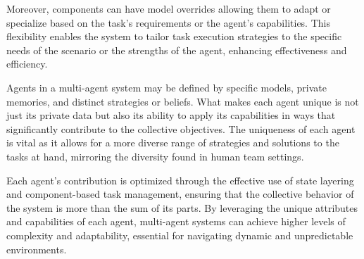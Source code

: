 Moreover, components can have model overrides allowing them to adapt or specialize based on the task's requirements or the agent's capabilities. This flexibility enables the system to tailor task execution strategies to the specific needs of the scenario or the strengths of the agent, enhancing effectiveness and efficiency.

Agents in a multi-agent system may be defined by specific models, private memories, and distinct strategies or beliefs. What makes each agent unique is not just its private data but also its ability to apply its capabilities in ways that significantly contribute to the collective objectives. The uniqueness of each agent is vital as it allows for a more diverse range of strategies and solutions to the tasks at hand, mirroring the diversity found in human team settings.

Each agent's contribution is optimized through the effective use of state layering and component-based task management, ensuring that the collective behavior of the system is more than the sum of its parts. By leveraging the unique attributes and capabilities of each agent, multi-agent systems can achieve higher levels of complexity and adaptability, essential for navigating dynamic and unpredictable environments.



%
